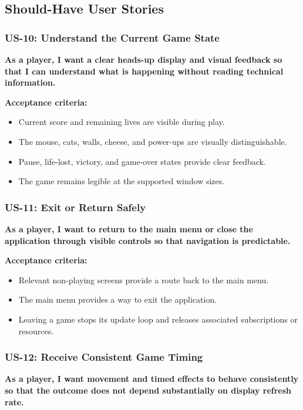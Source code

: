 \subsection{Should-Have User Stories}

\subsubsection{US-10: Understand the Current Game State}

\textbf{As a player, I want a clear heads-up display and visual feedback so that I can understand what is happening without reading technical information.}

\textbf{Acceptance criteria:}
\begin{itemize}
	\item Current score and remaining lives are visible during play.
	\item The mouse, cats, walls, cheese, and power-ups are visually distinguishable.
	\item Pause, life-lost, victory, and game-over states provide clear feedback.
	\item The game remains legible at the supported window sizes.
\end{itemize}

\subsubsection{US-11: Exit or Return Safely}

\textbf{As a player, I want to return to the main menu or close the application through visible controls so that navigation is predictable.}

\textbf{Acceptance criteria:}
\begin{itemize}
	\item Relevant non-playing screens provide a route back to the main menu.
	\item The main menu provides a way to exit the application.
	\item Leaving a game stops its update loop and releases associated subscriptions or resources.
\end{itemize}

\subsubsection{US-12: Receive Consistent Game Timing}

\textbf{As a player, I want movement and timed effects to behave consistently so that the outcome does not depend substantially on display refresh rate.}

